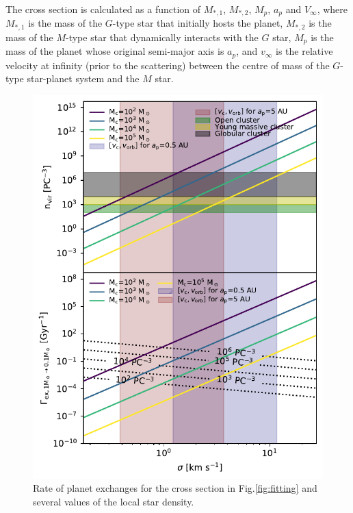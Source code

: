 \documentclass[twocolumn]{aastex62}
\begin{document}
The cross section is calculated as a function of $M_{*,1}$, $M_{*,2}$, $M_p$, $a_p$ and $V_\infty$, where $M_{*,1}$ is the mass of the $G$-type star that initially hosts the planet, $M_{*,2}$ is the mass of the $M$-type star that dynamically interacts with the $G$ star, $M_p$ is the mass of the planet whose original semi-major axis is $a_p$, and $v_\infty$ is the relative velocity at infinity (prior to the scattering) between the centre of mass of the $G$-type star-planet system and the $M$ star.

\begin{figure}
 \includegraphics[width=0.9\columnwidth]{letter-rate-dispersion}
  \caption{Rate of planet exchanges for the cross section in Fig.\ref{fig:fitting} and several values of the local star density.}
 \label{fig:rate}
\end{figure}
\end{document}
